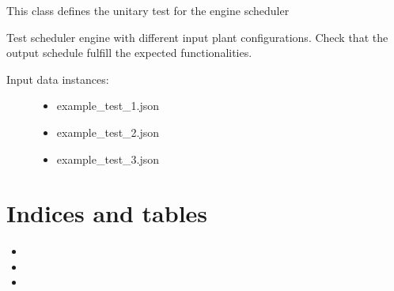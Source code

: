 \documentclass[letterpaper,10pt,english]{sphinxmanual}
\begin{document}
\begin{fulllineitems}
\label{\detokenize{index:test.test_engine.EngineTest}}
\sphinxAtStartPar
{}

\sphinxAtStartPar
This class defines the unitary test for the engine scheduler

\begin{fulllineitems}
\label{\detokenize{index:test.test_engine.EngineTest.test_engine}}
\sphinxAtStartPar
{}

\sphinxAtStartPar
Test scheduler engine with different input plant configurations. Check that the output schedule fulfill the
expected functionalities.
\begin{description}
\item[{Input data instances:}] \leavevmode\begin{itemize}
\item {} 
\sphinxAtStartPar
example\_test\_1.json

\item {} 
\sphinxAtStartPar
example\_test\_2.json

\item {} 
\sphinxAtStartPar
example\_test\_3.json

\end{itemize}

\end{description}

\end{fulllineitems}


\end{fulllineitems}



\chapter{Indices and tables}
\label{\detokenize{index:indices-and-tables}}\begin{itemize}
\item {} 
\sphinxAtStartPar
{}

\item {} 
\sphinxAtStartPar
{}

\item {} 
\sphinxAtStartPar
{}

\end{itemize}
\end{document}
